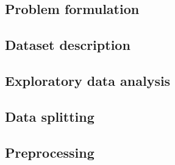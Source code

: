 
\subsection{Problem formulation}
\label{subsec:problem-and-data-1}


\subsection{Dataset description}
\label{subsec:problem-and-data-2}


\subsection{Exploratory data analysis}
\label{subsec:problem-and-data-3}


\subsection{Data splitting}
\label{subsec:problem-and-data-4}


\subsection{Preprocessing}
\label{subsec:problem-and-data-5}

